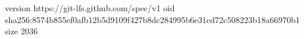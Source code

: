 version https://git-lfs.github.com/spec/v1
oid sha256:8574b855ef0afb12b5d9109f427b8dc284995b6e31cd72c508223b18a66970b1
size 2036
